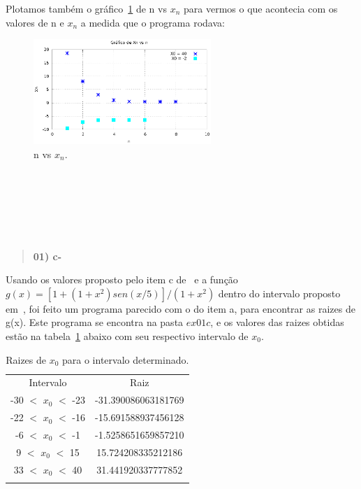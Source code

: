 \documentclass[a4wide]{report}
\begin{document}
Plotamos também o gráfico~\ref{ex01a1.2} de n vs $x_n$  para vermos o que acontecia com os valores de n e $x_n$ a medida que o programa rodava:
\begin{figure}[h]
\centering
\includegraphics[width=0.6\textwidth]{grafico_do_ex01a_x=40_e_x0-2}
\caption{n vs $x_n$.}
\label{ex01a1.2}
\end{figure}
\\
\\
\\
\\
\\
\begin{quote}

\bf 01) c-

\end{quote}

Usando os valores proposto pelo item c de~\cite{roteiro} e a função $g(x) = [1 + (1 + x^2 )sen(x/5)]/(1 + x^2 )$ 
dentro do intervalo proposto em~\cite{roteiro}, foi feito um programa parecido com o do item a, para encontrar as raizes de g(x). 
Este programa se encontra na pasta $ex01c$, e os valores das raizes obtidas estão na tabela~\ref{intervalosraizes} abaixo com seu respectivo intervalo 
de $x_0$.

\begin{table}[!h]
\centering
 \begin{tabular}{cc}
  \hline\\[-0.37cm]
  \hline
      Intervalo       &   Raiz          \\ \hline
  -30 $<$ $x_0$ $<$ -23      &  -31.390086063181769     \\
  -22 $<$ $x_0$ $<$ -16      &	-15.691588937456128                 \\
 -6 $<$ $x_0$ $<$ -1       &    -1.5258651659857210          \\
 9 $<$ $x_0$ $<$ 15         &	    15.724208335212186               \\
 33 $<$ $x_0$ $<$ 40            &	31.441920337777852      \\
 \hline\\[-0.37cm]
  \hline
\end{tabular}
\caption{Raizes de $x_0$ para o intervalo determinado.}
\label{intervalosraizes}
\end{table}
\end{document}
